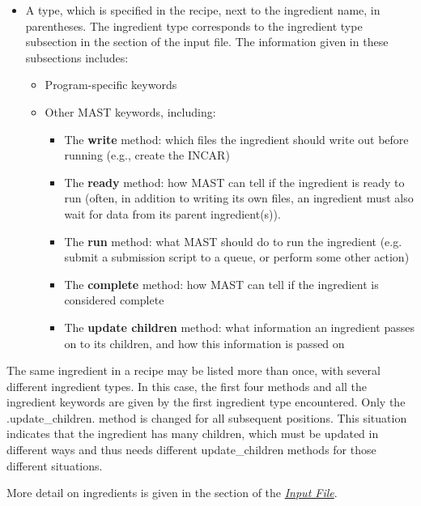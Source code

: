 \documentclass[letterpaper,10pt,english]{sphinxmanual}
\begin{document}
\begin{itemize}
\item {} 
A type, which is specified in the recipe, next to the ingredient name, in parentheses. The ingredient type corresponds to the ingredient type subsection in the  section of the input file. The information given in these subsections includes:
\begin{itemize}
\item {} 
Program-specific keywords

\item {} 
Other MAST keywords, including:
\begin{itemize}
\item {} 
The \textbf{write} method: which files the ingredient should write out before running (e.g., create the INCAR)

\item {} 
The \textbf{ready} method: how MAST can tell if the ingredient is ready to run (often, in addition to writing its own files, an ingredient must also wait for data from its parent ingredient(s)).

\item {} 
The \textbf{run} method: what MAST should do to run the ingredient (e.g. submit a submission script to a queue, or perform some other action)

\item {} 
The \textbf{complete} method: how MAST can tell if the ingredient is considered complete

\item {} 
The \textbf{update children} method: what information an ingredient passes on to its children, and how this information is passed on

\end{itemize}

\end{itemize}

\end{itemize}

The same ingredient in a recipe may be listed more than once, with several different ingredient types. In this case, the first four methods and all the ingredient keywords are given by the first ingredient type encountered. Only the .update\_children. method is changed for all subsequent positions. This situation indicates that the ingredient has many children, which must be updated in different ways and thus needs different update\_children methods for those different situations.

More detail on ingredients is given in the  section of the {\hyperref[3_0_inputfile::doc]{\emph{Input File}}}.
\end{document}
